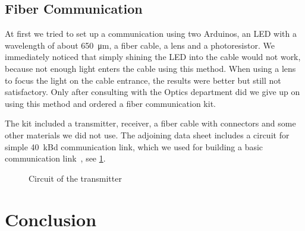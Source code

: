\documentclass[11pt,twoside,a4paper]{scrartcl}
\begin{document}
	\subsection{Fiber Communication}
		At first we tried to set up a communication using two Arduinos, an LED with a wavelength of about \SI{650}{\micro\meter},
		a fiber cable, a lens and a photoresistor.
		We immediately noticed that simply shining the LED into the cable would not work,
		because not enough light enters the cable using this method.
		When using a lens to focus the light on the cable entrance,
		the results were better but still not satisfactory.
		Only after consulting with the Optics department did we give up on using this method
		and ordered a fiber communication kit.

		The kit included a transmitter, receiver, a fiber cable with connectors and some other materials we did not use.
		The adjoining data sheet includes a circuit for simple \SI{40}{\kilo Bd} communication link,
		which we used for building a basic communication link~\cite[p.15]{avagokit},
		see \cref{fig:transmitter}.

		\begin{figure}
			\centering
			\caption{Circuit of the transmitter}
			\label{fig:transmitter}
		\end{figure}

\section{Conclusion}



\end{document}
